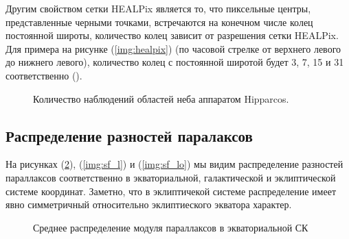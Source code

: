 \documentclass[14pt]{article} %
\begin{document}
Другим свойством сетки HEALPix является то, что пиксельные центры, представленные черными точками, встречаются на конечном числе колец постоянной широты, количество колец зависит от разрешения сетки HEALPix. Для примера на рисунке (\ref{img:healpix}) (по часовой стрелке от верхнего левого до нижнего левого), количество колец с постоянной широтой будет 3, 7, 15 и 31 соответственно (\cite{wiki:healpix}).

\begin{figure}[h!]
\caption{Количество наблюдений областей неба аппаратом Hipparcos.}
\label{img:nobs}
\end{figure}


\subsection{Распределение разностей паралаксов}\label{sub:smthhealpix}

На рисунках (\ref{img:sf_ra}), (\ref{img:sf_l}) и (\ref{img:sf_lo}) мы видим распределение разностей параллаксов соответственно в экваториальной, галактической и эклиптической системе координат. Заметно, что в эклиптичекой системе распределение имеет явно симметричный относительно эклиптиеского экватора характер.

\begin{figure}[h!]
\caption{Среднее распределение модуля параллаксов в экваториальной СК }
\label{img:sf_ra}
\end{figure}
\end{document}
